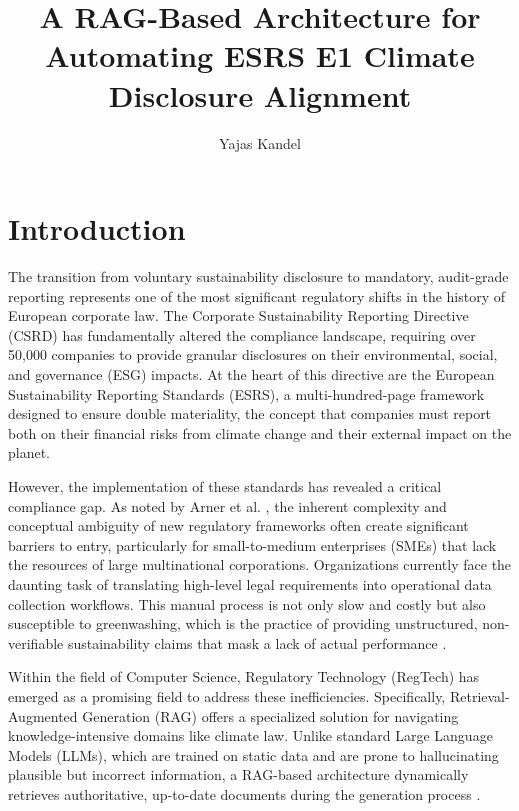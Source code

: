 \documentclass[12pt]{article}
\title{\textbf{A RAG-Based Architecture for Automating ESRS E1 Climate Disclosure Alignment}}
\author{Yajas Kandel}
\begin{document}
\maketitle

\section{Introduction}
The transition from voluntary sustainability disclosure to mandatory, audit-grade reporting represents one of the most significant regulatory shifts in the history of European corporate law. The Corporate Sustainability Reporting Directive (CSRD) has fundamentally altered the compliance landscape, requiring over 50,000 companies to provide granular disclosures on their environmental, social, and governance (ESG) impacts. At the heart of this directive are the European Sustainability Reporting Standards (ESRS), a multi-hundred-page framework designed to ensure double materiality, the concept that companies must report both on their financial risks from climate change and their external impact on the planet.

However, the implementation of these standards has revealed a critical compliance gap. As noted by Arner et al. \cite{article}, the inherent complexity and conceptual ambiguity of new regulatory frameworks often create significant barriers to entry, particularly for small-to-medium enterprises (SMEs) that lack the resources of large multinational corporations. Organizations currently face the daunting task of translating high-level legal requirements into operational data collection workflows. This manual process is not only slow and costly but also susceptible to greenwashing, which is the practice of providing unstructured, non-verifiable sustainability claims that mask a lack of actual performance \cite{articleEPJ}.

Within the field of Computer Science, Regulatory Technology (RegTech) has emerged as a promising field to address these inefficiencies. Specifically, Retrieval-Augmented Generation (RAG) offers a specialized solution for navigating knowledge-intensive domains like climate law. Unlike standard Large Language Models (LLMs), which are trained on static data and are prone to hallucinating plausible but incorrect information, a RAG-based architecture dynamically retrieves authoritative, up-to-date documents during the generation process \cite{lewis2021retrievalaugmentedgenerationknowledgeintensivenlp}.
\end{document}
